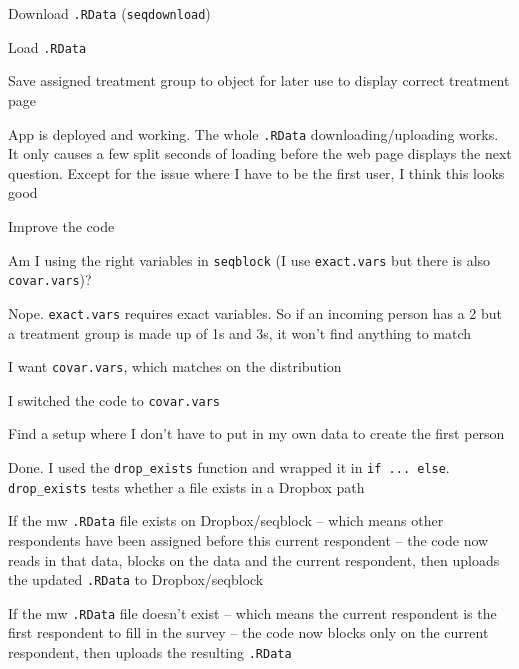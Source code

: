\begin{coi}
\begin{coi}
\begin{coi}
\begin{coi}
								\item Download \texttt{.RData} (\texttt{seqdownload})
								\item Load \texttt{.RData}
								\item Save assigned treatment group to object for later use to display correct treatment page
							\end{coi}
					\end{coi}
				\item App is deployed and working. The whole \texttt{.RData} downloading/uploading works. It only causes a few split seconds of loading before the web page displays the next question. Except for the issue where I have to be the first user, I think this looks good
			\end{coi}
		\item Improve the code
			\begin{coi}
				\item Am I using the right variables in \texttt{seqblock} (I use \texttt{exact.vars} but there is also \texttt{covar.vars})?
					\begin{coi}
						\item Nope. \texttt{exact.vars} requires exact variables. So if an incoming person has a 2 but a treatment group is made up of 1s and 3s, it won't find anything to match
						\item I want \texttt{covar.vars}, which matches on the distribution
						\item I switched the code to \texttt{covar.vars}
					\end{coi}
				\item Find a setup where I don't have to put in my own data to create the first person
					\begin{coi}
						\item Done. I used the \texttt{drop\_exists} function and wrapped it in \texttt{if ... else}. \texttt{drop\_exists} tests whether a file exists in a Dropbox path
						\item If the mw \texttt{.RData} file exists on Dropbox/seqblock -- which means other respondents have been assigned before this current respondent -- the code now reads in that data, blocks on the data and the current respondent, then uploads the updated \texttt{.RData} to Dropbox/seqblock
						\item If the mw \texttt{.RData} file doesn't exist -- which means the current respondent is the first respondent to fill in the survey --  the code now blocks only on the current respondent, then uploads the resulting \texttt{.RData}

\end{coi}
\end{coi}
\end{coi}
